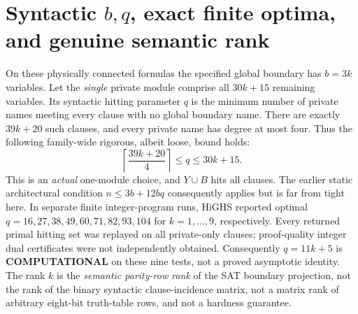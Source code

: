 \documentclass[10pt]{article}
\begin{document}
\section{Syntactic $b,q$, exact finite optima, and genuine semantic rank}
\noindent On these physically connected formulas the specified global boundary has $b=3k$ variables. Let the \emph{single} private module comprise all $30k+15$ remaining variables. Its syntactic hitting parameter $q$ is the minimum number of private names meeting every clause with no global boundary name. There are exactly $39k+20$ such clauses, and every private name has degree at most four. Thus the following family-wide rigorous, albeit loose, bound holds:
\begin{equation}\label{eq:qbound}
 \left\lceil\frac{39k+20}{4}\right\rceil\le q\le30k+15.
\end{equation}
This is an \emph{actual} one-module choice, and $Y\cup B$ hits all clauses. The earlier static architectural condition $n\le3b+12bq$ consequently applies but is far from tight here. In separate finite integer-program runs, HiGHS reported optimal $q=16,27,38,49,60,71,82,93,104$ for $k=1,\ldots,9$, respectively. Every returned primal hitting set was replayed on all private-only clauses; proof-quality integer dual certificates were not independently obtained. Consequently $q=11k+5$ is \textbf{COMPUTATIONAL} on these nine tests, not a proved asymptotic identity. The rank $k$ is the \emph{semantic parity-row rank} of the SAT boundary projection, not the rank of the binary syntactic clause-incidence matrix, not a matrix rank of arbitrary eight-bit truth-table rows, and not a hardness guarantee.
\end{document}
